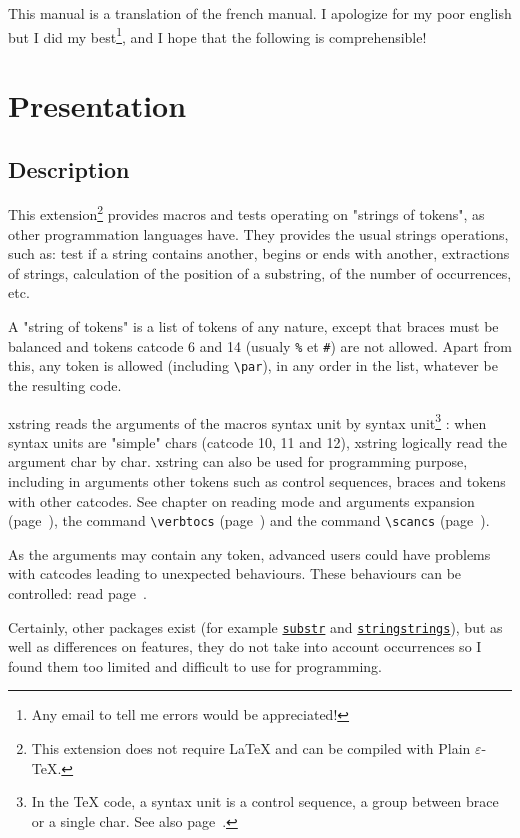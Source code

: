 \documentclass[a4paper,10pt]{article}
\newcommand\guill[1]{"#1"}
\newcommand\US{syntax unit\xspace}
\newcommand\USs{syntax units\xspace}
\newcommand\Xstring{\textsf{xstring}\xspace}
\newcommand\verbinline{\lstinline[basicstyle=\normalsize\ttfamily]}
\begin{document}
\tableofcontents

This manual is a translation of the french manual. I apologize for my poor english but I did my best\footnote{Any email to tell me errors would be appreciated!}, and I hope that the following is comprehensible!
\section{Presentation}
\subsection{Description}
This extension\footnote{This extension does not require \LaTeX{} and can be compiled with Plain $\varepsilon$-\TeX{}.} provides macros and tests operating on "strings of tokens", as other programmation languages have. They provides the usual strings operations, such as: test if a string contains another, begins or ends with another, extractions of strings, calculation of the position of a substring, of the number of occurrences, etc.\medskip

A "string of tokens" is a list of tokens of any nature, except that braces must be balanced and tokens catcode 6 and 14 (usualy \verb|%| et \verb|#|) are not allowed. Apart from this, any token is allowed (including \verbinline|\par|), in any order in the list, whatever be the resulting code.\medskip

\Xstring reads the arguments of the macros \US by \US\footnote{In the \TeX{} code, a \US is a control sequence, a group between brace or a single char. See also page~\pageref{developpementarguments}.} : when \USs are \guill{simple} chars (catcode 10, 11 and 12), \Xstring logically read the argument char by char. \Xstring can also be used for programming purpose, including in arguments other tokens such as control sequences, braces and tokens with other catcodes. See chapter on reading mode and arguments expansion (page~\pageref{developpementarguments}), the command \verbinline|\verbtocs| (page~\pageref{verbtocs}) and the command \verbinline|\scancs| (page~\pageref{scancs}).\medskip

As the arguments may contain any token, advanced users could have problems with catcodes leading to unexpected behaviours. These behaviours can be controlled: read page~\pageref{macrosetoilees}.\medskip

Certainly, other packages exist (for example \href{http://www.ctan.org/tex-archive/macros/latex/contrib/substr/}{\nolinkurl{substr}} and \href{http://www.ctan.org/tex-archive/macros/latex/contrib/stringstrings/}{\nolinkurl{stringstrings}}), but as well as differences on features, they do not take into account occurrences so I found them too limited and difficult to use for programming.
\end{document}
